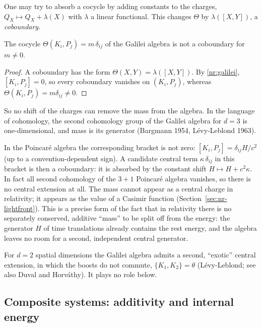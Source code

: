 One may try to absorb a cocycle by adding constants to the charges,
$Q_X\mapsto Q_X+\lambda(X)$ with $\lambda$ a linear functional. This changes
$\Theta$ by $\lambda([X,Y])$, a \emph{coboundary}.

\begin{nrprop}\label{nr:prop-nontrivial}
The cocycle $\Theta(K_i,P_j)=m\,\delta_{ij}$ of the Galilei algebra is not a
coboundary for $m\neq0$.
\end{nrprop}
\begin{proof}
A coboundary has the form $\Theta(X,Y)=\lambda([X,Y])$. By \eqref{nr:galilei},
$[K_i,P_j]=0$, so every coboundary vanishes on $(K_i,P_j)$, whereas
$\Theta(K_i,P_j)=m\delta_{ij}\neq0$.
\end{proof}

So no shift of the charges can remove the mass from the algebra. In the
language of cohomology, the second cohomology group of the Galilei algebra for
$d=3$ is one-dimensional, and mass is its generator (Bargmann 1954,
L\'evy-Leblond 1963).

\begin{nrrem}
In the Poincar\'e algebra the corresponding bracket is not zero:
$[K_i,P_j]=\delta_{ij}H/c^2$ (up to a convention-dependent sign). A candidate
central term $\kappa\,\delta_{ij}$ in this bracket is then a coboundary: it is
absorbed by the constant shift $H\mapsto H+c^2\kappa$. In fact all
second cohomology of the $3{+}1$ Poincar\'e algebra vanishes, so there is no
central extension at all. The mass cannot appear as a central charge in
relativity; it appears as the value of a Casimir function (Section~\ref{sec:nr-lightfront}).
This is a precise form of the fact that in relativity there is no separately
conserved, additive ``mass'' to be split off from the energy: the generator $H$
of time translations already contains the rest energy, and the algebra leaves no
room for a second, independent central generator.
\end{nrrem}

\begin{nrrem}[A second extension in $d=2$]
For $d=2$ spatial dimensions the Galilei algebra admits a second, ``exotic''
central extension, in which the boosts do not commute,
$\{K_1,K_2\}=\theta$ (L\'evy-Leblond; see also Duval and Horv\'athy). It plays no
role below.
\end{nrrem}

\subsection{Composite systems: additivity and internal energy}

